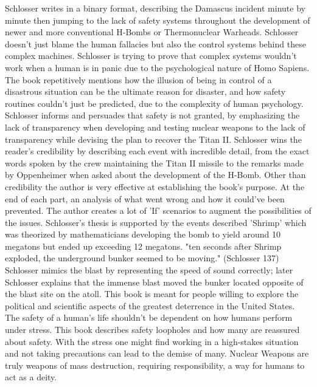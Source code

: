 \documentclass[12pt,letterpaper]{article}
\begin{document}
\begin{flushleft}
Schlosser writes in a binary format, describing the Damascus incident minute by minute then jumping to the lack of safety systems throughout the development of newer and more conventional H-Bombs or Thermonuclear Warheads. Schlosser doesn't just blame the human fallacies but also the control systems behind these complex machines. Schlosser is trying to prove that complex systems wouldn't work when a human is in panic due to the psychological nature of Homo Sapiens. The book repetitively mentions how the illusion of being in control of a disastrous situation can be the ultimate reason for disaster, and how safety routines couldn't just be predicted, due to the complexity of human psychology. Schlosser informs and persuades that safety is not granted, by emphasizing the lack of transparency when developing and testing nuclear weapons to the lack of transparency while devising the plan to recover the Titan II. Schlosser wins the reader's credibility by describing each event with incredible detail, from the exact words spoken by the crew maintaining the Titan II missile to the remarks made by Oppenheimer when asked about the development of the H-Bomb. Other than credibility the author is very effective at establishing the book's purpose. At the end of each part, an analysis of what went wrong and how it could've been prevented. The author creates a lot of 'If' scenarios to augment the possibilities of the issues. Schlosser's thesis is supported by the events described 'Shrimp' which was theorized by mathematicians developing the bomb to yield around 10 megatons but ended up exceeding 12 megatons. "ten seconds after Shrimp exploded, the underground bunker seemed to be moving." (Schlosser 137) Schlosser mimics the blast by representing the speed of sound correctly; later Schlosser explains that the immense blast moved the bunker located opposite of the blast site on the atoll. This book is meant for people willing to explore the political and scientific aspects of the greatest deterrence in the United States. The safety of a human's life shouldn't be dependent on how humans perform under stress. This book describes safety loopholes and how many are reassured about safety. With the stress one might find working in a high-stakes situation and not taking precautions can lead to the demise of many. Nuclear Weapons are truly weapons of mass destruction, requiring responsibility, a way for humans to act as a deity.

\newpage

\printbibliography


\end{flushleft}
\end{document}
